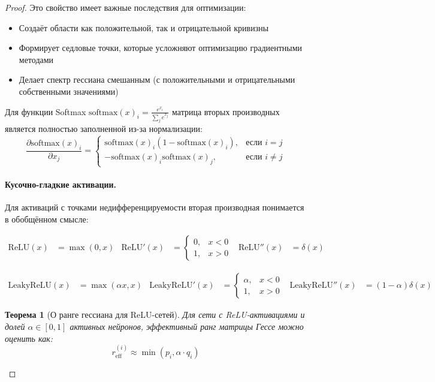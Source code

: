\documentclass[a4paper,12pt]{article}
\newtheorem{theorem}{Теорема}
\begin{document}
\begin{proof}
    Это свойство имеет важные последствия для оптимизации:
    \begin{itemize}
    \item Создаёт области как положительной, так и отрицательной кривизны
    \item Формирует седловые точки, которые усложняют оптимизацию градиентными методами
    \item Делает спектр гессиана смешанным (с положительными и отрицательными собственными значениями)
    \end{itemize}
    
    Для функции Softmax $\text{softmax}(x)_i = \frac{e^{x_i}}{\sum_{j} e^{x_j}}$ матрица вторых производных является полностью заполненной из-за нормализации:
    \begin{equation}
    \frac{\partial \text{softmax}(x)_i}{\partial x_j} = 
    \begin{cases}
    \text{softmax}(x)_i (1 - \text{softmax}(x)_i), & \text{если } i = j \\
    -\text{softmax}(x)_i \text{softmax}(x)_j, & \text{если } i \neq j
    \end{cases}
    \end{equation}
    
    \paragraph{Кусочно-гладкие активации.}
    Для активаций с точками недифференцируемости вторая производная понимается в обобщённом смысле:
    
    \begin{align}
    \text{ReLU}(x) &= \max(0,x) &\text{ReLU}'(x) &= 
    \begin{cases}
    0, & x < 0 \\
    1, & x > 0
    \end{cases} &\text{ReLU}''(x) &= \delta(x)
    \end{align}
    
    \begin{align}
    \text{LeakyReLU}(x) &= \max(\alpha x, x) &\text{LeakyReLU}'(x) &= 
    \begin{cases}
    \alpha, & x < 0 \\
    1, & x > 0
    \end{cases} &\text{LeakyReLU}''(x) &= (1-\alpha)\delta(x)
    \end{align}
    
    \begin{theorem}[О ранге гессиана для ReLU-сетей]
    Для сети с ReLU-активациями и долей $\alpha \in [0,1]$ активных нейронов, эффективный ранг матрицы Гессе можно оценить как:
    \begin{equation}
    r_{\text{eff}}^{(i)} \approx \min(p_i, \alpha \cdot q_i)
    \end{equation}
    \end{theorem}
    

\end{proof}
\end{document}
